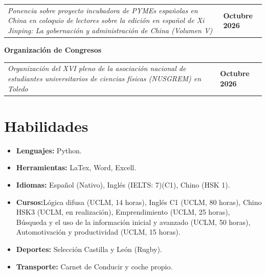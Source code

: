\documentclass[11pt,a4paper]{article}
\begin{document}
\noindent
\begin{tabularx}{\textwidth}{@{}X >{\raggedleft\arraybackslash\bfseries}p{2.8cm}@{}}
\textit{Ponencia sobre proyecto incubadora de PYMEs españolas en China en coloquio de lectores sobre la edición en español de Xi Jinping: La gobernación y administración de China (Volumen V)} & Octubre 2026\\[2pt]

\end{tabularx}
\noindent\textbf{Organización de Congresos}\par\smallskip

\noindent
\begin{tabularx}{\textwidth}{@{}X >{\raggedleft\arraybackslash\bfseries}p{2.8cm}@{}}
\textit{Organización del XVI pleno de la asociación nacional de estudiantes universitarios de ciencias físicas (NUSGREM) en Toledo} & Octubre 2026\\[2pt]
\end{tabularx}
\section*{Habilidades}
\begin{itemize}[leftmargin=*,nosep]
    \item \textbf{Lenguajes:} Python.
    \item \textbf{Herramientas:} LaTex, Word, Excell.
    \item \textbf{Idiomas:} Español (Nativo), Inglés (IELTS: 7)(C1), Chino (HSK 1).
    \item \textbf{Cursos:}Lógica difusa (UCLM, 14 horas), Inglés C1 (UCLM, 80 horas), Chino HSK3 (UCLM, en realización), Emprendimiento (UCLM, 25 horas), Búsqueda y el uso de la información inicial y avanzado (UCLM, 50 horas), Automotivación y productividad (UCLM, 15 horas).
    \item \textbf{Deportes:} Selección Castilla y León (Rugby).
    \item \textbf{Transporte:} Carnet de Conducir y coche propio.
\end{itemize}
\end{document}
